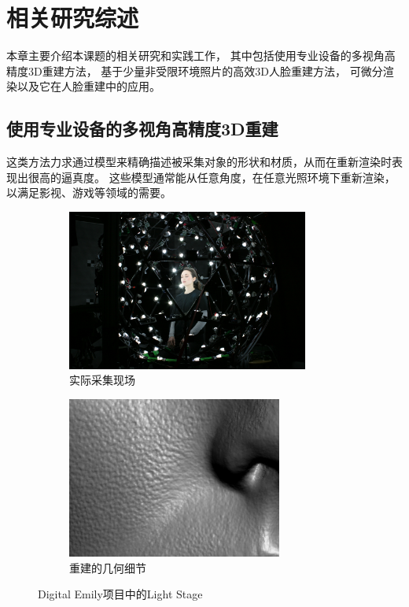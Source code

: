 \chapter{相关研究综述}
\label{chap:related_work}

本章主要介绍本课题的相关研究和实践工作，
其中包括使用专业设备的多视角高精度3D重建方法，
基于少量非受限环境照片的高效3D人脸重建方法，
可微分渲染以及它在人脸重建中的应用。

\section{使用专业设备的多视角高精度3D重建}

这类方法力求通过模型来精确描述被采集对象的形状和材质，从而在重新渲染时表现出很高的逼真度。
这些模型通常能从任意角度，在任意光照环境下重新渲染，以满足影视、游戏等领域的需要。

\begin{figure}
\centering
\begin{subfigure}[b]{0.5\textwidth}
    \centering
    \includegraphics[height=150pt]{figures/light_stage}
    \caption{实际采集现场}
\end{subfigure}
\begin{subfigure}[b]{0.45\textwidth}
    \centering
    \includegraphics[height=150pt]{figures/emily_detail_1}
    \caption{重建的几何细节}
\end{subfigure}
\caption[Digital Emily 项目中的 Light Stage]{Digital Emily项目中的Light Stage\cite{DEP}}
\end{figure}

